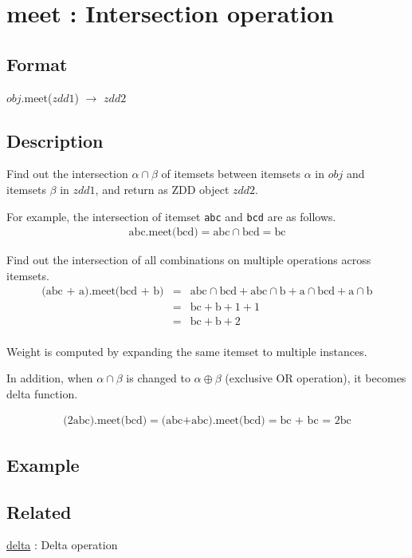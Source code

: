 
\section{meet : Intersection operation\label{sect:meet}}
\subsection*{Format}
$obj$.meet($zdd1$) $\rightarrow$ $zdd2$

\subsection*{Description}
Find out the intersection $\alpha \cap \beta$ of itemsets between itemsets $\alpha$ in $obj$ and itemsets $\beta$ in $zdd1$, and return as ZDD object $zdd2$. 

For example, the intersection of itemset \verb|abc| and \verb|bcd| are as follows. 
\begin{eqnarray*}
\textrm{abc.meet(bcd)} = \textrm{abc} \cap \textrm{bcd} = \textrm{bc}
\end{eqnarray*}

Find out the intersection of all combinations on multiple operations across itemsets.   \begin{eqnarray*}
\textrm{(abc + a).meet(bcd + b)} &=&
\textrm{abc} \cap \textrm{bcd} + \textrm{abc} \cap \textrm{b} +
\textrm{a} \cap \textrm{bcd} + \textrm{a} \cap \textrm{b}\\
&=& \textrm{bc}  + \textrm{b} + 1 + 1\\
&=& \textrm{bc} + \textrm{b} + 2\\
\end{eqnarray*}

Weight is computed by expanding the same itemset to multiple instances. 

In addition, when $\alpha \cap \beta$ is changed to $\alpha \oplus \beta$ (exclusive OR operation), it becomes delta function. 

\begin{eqnarray*}
\textrm{(2abc).meet(bcd)} = \textrm{(abc+abc).meet(bcd)} = \textrm{bc + bc = 2bc}
\end{eqnarray*}

\subsection*{Example}


\subsection*{Related}
\hyperref[sect:delta]{delta} : Delta operation

